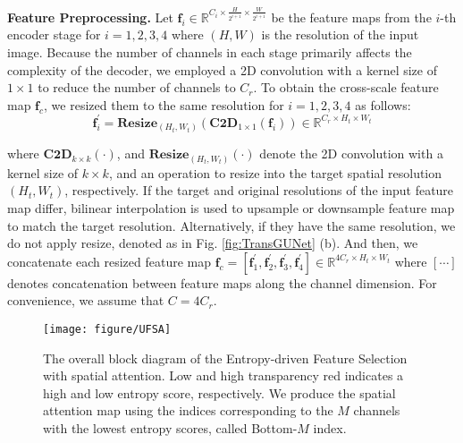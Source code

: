 \noindent \textbf{Feature Preprocessing.} Let $\mathbf{f}_{i} \in \mathbb{R}^{C_{i} \times \frac{H}{2^{i + 1}} \times \frac{W}{2^{i + 1}}}$ be the feature maps from the $i$-th encoder stage for $i = 1, 2, 3, 4$ where $(H, W)$ is the resolution of the input image. Because the number of channels in each stage primarily affects the complexity of the decoder, we employed a 2D convolution with a kernel size of $1 \times 1$ to reduce the number of channels to $C_{r}$. To obtain the cross-scale feature map $\mathbf{f}_{c}$, we resized them to the same resolution for $i = 1, 2, 3, 4$ as follows:
\begin{equation}
    \mathbf{f}^{'}_{i} = \textbf{Resize}_{(H_{t}, W_{t})} (\textbf{C2D}_{1 \times 1} (\mathbf{f}_{i})) \in \mathbb{R}^{C_{r} \times H_{t} \times W_{t}}
\end{equation}

\noindent where $\textbf{C2D}_{k \times k} ( \cdot )$, and $\textbf{Resize}_{(H_{t}, W_{t})} (\cdot)$ denote the 2D convolution with a kernel size of $k \times k$, and an operation to resize into the target spatial resolution $(H_{t}, W_{t})$, respectively. If the target and original resolutions of the input feature map differ, bilinear interpolation is used to upsample or downsample feature map to match the target resolution. Alternatively, if they have the same resolution, we do not apply resize, denoted as  in Fig. \ref{fig:TransGUNet} (b). And then, we concatenate each resized feature map $\mathbf{f}_{c} = \left[ \mathbf{f}^{'}_{1}, \mathbf{f}^{'}_{2}, \mathbf{f}^{'}_{3}, \mathbf{f}^{'}_{4} \right] \in \mathbb{R}^{4C_{r} \times H_{t} \times W_{t}}$ where $\left[ \cdots \right]$ denotes concatenation between feature maps along the channel dimension. For convenience, we assume that $C = 4C_{r}$.

\begin{figure}[t]
    \centering
    \texttt{[image: figure/UFSA]}
    \caption{The overall block diagram of the Entropy-driven Feature Selection with spatial attention. Low and high transparency red indicates a high and low entropy score, respectively. We produce the spatial attention map using the indices corresponding to the $M$ channels with the lowest entropy scores, called Bottom-$M$ index.}
    \label{fig:ESA_based_spatial_attention}
\end{figure}

